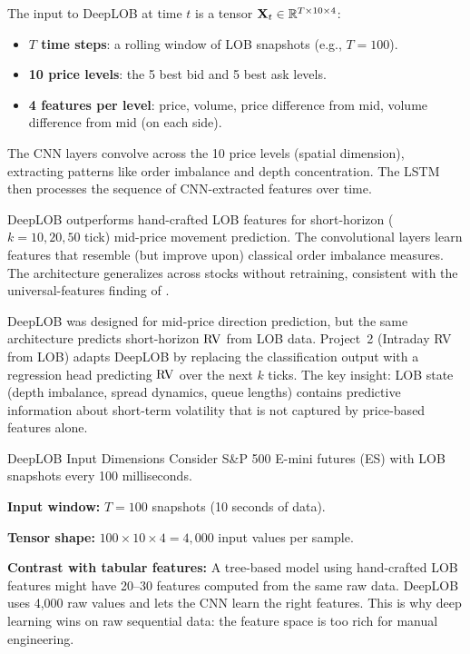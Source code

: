 \begin{definition}
The input to DeepLOB at time $t$ is a tensor $\mathbf{X}_t \in \mathbb{R}^{T \times 10 \times 4}$:
\begin{itemize}[nosep]
  \item \textbf{$T$ time steps}: a rolling window of LOB snapshots (e.g., $T = 100$).
  \item \textbf{10 price levels}: the 5 best bid and 5 best ask levels.
  \item \textbf{4 features per level}: price, volume, price difference from mid, volume difference from mid (on each side).
\end{itemize}
The CNN layers convolve across the 10 price levels (spatial dimension), extracting patterns like order imbalance and depth concentration.
The LSTM then processes the sequence of CNN-extracted features over time.
\end{definition}

\begin{keyresult}
DeepLOB outperforms hand-crafted LOB features for short-horizon ($k = 10, 20, 50$ tick) mid-price movement prediction.
The convolutional layers learn features that resemble (but improve upon) classical order imbalance measures.
The architecture generalizes across stocks without retraining, consistent with the universal-features finding of \citet{SirignanoCont2019}.
\end{keyresult}

\begin{application}
DeepLOB was designed for mid-price direction prediction, but the same architecture predicts short-horizon $\operatorname{RV}$ from LOB data.
Project~2 (Intraday RV from LOB) adapts DeepLOB by replacing the classification output with a regression head predicting $\operatorname{RV}$ over the next $k$ ticks.
The key insight: LOB state (depth imbalance, spread dynamics, queue lengths) contains predictive information about short-term volatility that is not captured by price-based features alone.
\end{application}

\begin{workedexample}{DeepLOB Input Dimensions}
Consider S\&P 500 E-mini futures (ES) with LOB snapshots every 100 milliseconds.

\textbf{Input window:} $T = 100$ snapshots (10 seconds of data).

\textbf{Tensor shape:} $100 \times 10 \times 4 = 4{,}000$ input values per sample.

\textbf{Contrast with tabular features:} A tree-based model using hand-crafted LOB features might have 20--30 features computed from the same raw data.
DeepLOB uses 4,000 raw values and lets the CNN learn the right features.
This is why deep learning wins on raw sequential data: the feature space is too rich for manual engineering.
\end{workedexample}


